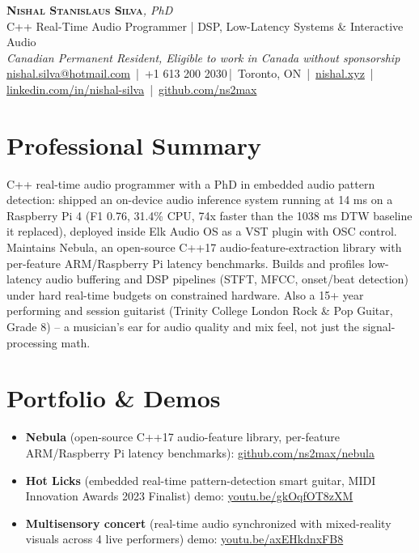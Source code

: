 \documentclass[11pt]{article}
\makeatletter
\newcommand{\cvName}{Nishal Stanislaus Silva}
\newcommand{\cvEmail}{nishal.silva@hotmail.com}
\newcommand{\cvPhone}{+1 613 200 2030}
\newcommand{\cvCity}{Toronto, ON}
\newcommand{\cvSite}{https://nishal.xyz}
\newcommand{\cvLinkedIn}{https://www.linkedin.com/in/nishal-silva}
\newcommand{\cvGitHub}{https://github.com/ns2max}
\newcommand{\cvStatus}{Canadian Permanent Resident, Eligible to work in Canada without sponsorship}
\newcommand{\cvTagline}{C++ Real-Time Audio Programmer | DSP, Low-Latency Systems \& Interactive Audio}
\makeatother
\begin{document}
\pagestyle{empty}
\begin{center}
    {\LARGE \scshape \textbf{\cvName}}{\large \textit{, PhD}}\\[1pt]
    {\small \cvTagline}\\[1pt]
    {\footnotesize\textit{\cvStatus}}\\[1pt]
    {\small
    \href{mailto:\cvEmail}{\cvEmail} \,|\, \cvPhone \,|\, \cvCity
    \,|\, \href{\cvSite}{nishal.xyz} \,|\, \href{\cvLinkedIn}{linkedin.com/in/nishal-silva}
    \,|\, \href{\cvGitHub}{github.com/ns2max}}
\end{center}

\section*{Professional Summary}
C++ real-time audio programmer with a PhD in embedded audio pattern detection: shipped an on-device audio inference system running at 14 ms on a Raspberry Pi 4 (F1 0.76, 31.4\% CPU, 74x faster than the 1038 ms DTW baseline it replaced), deployed inside Elk Audio OS as a VST plugin with OSC control. Maintains Nebula, an open-source C++17 audio-feature-extraction library with per-feature ARM/Raspberry Pi latency benchmarks. Builds and profiles low-latency audio buffering and DSP pipelines (STFT, MFCC, onset/beat detection) under hard real-time budgets on constrained hardware. Also a 15+ year performing and session guitarist (Trinity College London Rock \& Pop Guitar, Grade 8) -- a musician's ear for audio quality and mix feel, not just the signal-processing math.

\section*{Portfolio \& Demos}
\begin{itemize}[leftmargin=2em, itemsep=-0.3em, topsep=-0.2em]
\item \textbf{Nebula} (open-source C++17 audio-feature library, per-feature ARM/Raspberry Pi latency benchmarks): \href{https://github.com/ns2max/nebula}{github.com/ns2max/nebula}
\item \textbf{Hot Licks} (embedded real-time pattern-detection smart guitar, MIDI Innovation Awards 2023 Finalist) demo: \href{https://youtu.be/gkOqfOT8zXM}{youtu.be/gkOqfOT8zXM}
\item \textbf{Multisensory concert} (real-time audio synchronized with mixed-reality visuals across 4 live performers) demo: \href{https://youtu.be/axEHkdnxFB8}{youtu.be/axEHkdnxFB8}
\end{itemize}
\end{document}
